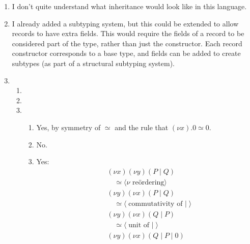 \documentclass{article}
\begin{document}
\begin{enumerate}
  \item I don't quite understand what inheritance would look like in this language.
  \item I already added a subtyping system, but this could be extended to allow records to have extra fields. This would require the fields of a record to be considered part of the type, rather than just the constructor. Each record constructor corresponds to a base type, and fields can be added to create subtypes (as part of a structural subtyping system).
  \item
    \begin{enumerate}
      \item
      \item
      \item
        \begin{enumerate}
          \item Yes, by symmetry of $\simeq$ and the rule that $(\nu x).0 \simeq 0$.
          \item No.
          \item Yes:
            \begin{align*}
              & (\nu x)(\nu y)(P \mid Q) \\
              & \quad \simeq \langle \text{$\nu$ re\"ordering} \rangle \\
              & (\nu y)(\nu x)(P \mid Q) \\
              & \quad \simeq \langle \text{commutativity of $\mid$} \rangle \\
              & (\nu y)(\nu x)(Q \mid P) \\
              & \quad \simeq \langle \text{unit of $\mid$} \rangle \\
              & (\nu y)(\nu x)(Q \mid P \mid 0) \\

\end{align*}
\end{enumerate}
\end{enumerate}
\end{enumerate}
\end{document}
